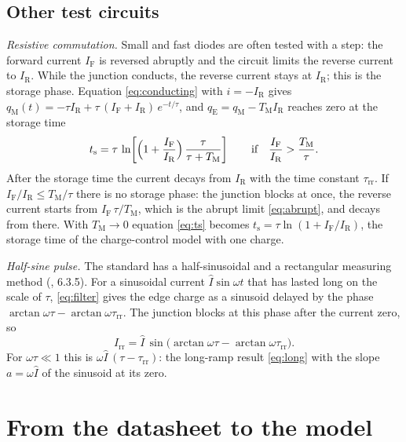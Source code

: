 \documentclass[10pt,a4paper]{scrartcl}
\newcommand{\IF}{I_\mathrm{F}}
\newcommand{\IR}{I_\mathrm{R}}
\newcommand{\Irr}{I_\mathrm{rr}}
\newcommand{\ts}{t_\mathrm{s}}
\newcommand{\taurr}{\tau_\mathrm{rr}}
\newcommand{\TM}{T_\mathrm{M}}
\newcommand{\qE}{q_\mathrm{E}}
\newcommand{\qM}{q_\mathrm{M}}
\begin{document}
\subsection{Other test circuits}
\label{sec:othertests}
\emph{Resistive commutation.} Small and fast diodes are often tested with a step: the forward current $\IF$ is reversed abruptly and the circuit limits the reverse current to $\IR$. While the junction conducts, the reverse current stays at $\IR$; this is the storage phase. Equation \eqref{eq:conducting} with $i = -\IR$ gives $\qM(t) = -\tau\IR + \tau\,(\IF+\IR)\,e^{-t/\tau}$, and $\qE = \qM - \TM\IR$ reaches zero at the storage time
\begin{equation}
\ts = \tau\,\ln\!\left[\Bigl(1+\frac{\IF}{\IR}\Bigr)\,\frac{\tau}{\tau+\TM}\right] \qquad \text{if} \quad \frac{\IF}{\IR} > \frac{\TM}{\tau} .
\label{eq:ts}
\end{equation}
After the storage time the current decays from $\IR$ with the time constant $\taurr$. If $\IF/\IR \leq \TM/\tau$ there is no storage phase: the junction blocks at once, the reverse current starts from $\IF\,\tau/\TM$, which is the abrupt limit \eqref{eq:abrupt}, and decays from there. With $\TM \to 0$ equation \eqref{eq:ts} becomes $\ts = \tau\ln(1+\IF/\IR)$, the storage time of the charge-control model with one charge.

\emph{Half-sine pulse.} The standard has a half-sinusoidal and a rectangular measuring method (\cite{iec60747}, 6.3.5). For a sinusoidal current $\hat I\sin\omega t$ that has lasted long on the scale of $\tau$, \eqref{eq:filter} gives the edge charge as a sinusoid delayed by the phase $\arctan\omega\tau - \arctan\omega\taurr$. The junction blocks at this phase after the current zero, so
\begin{equation}
\Irr = \hat I\,\sin\bigl(\arctan\omega\tau - \arctan\omega\taurr\bigr) .
\label{eq:sine}
\end{equation}
For $\omega\tau \ll 1$ this is $\omega\hat I\,(\tau-\taurr)$: the long-ramp result \eqref{eq:long} with the slope $a = \omega\hat I$ of the sinusoid at its zero.

\section{From the datasheet to the model}
\label{sec:inverse}
\end{document}
